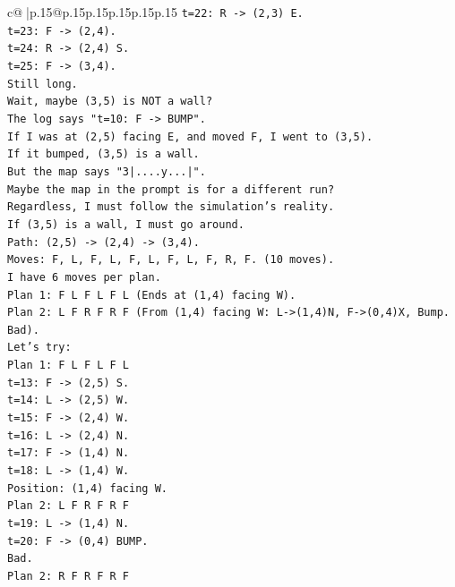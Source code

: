 \documentclass{article}
\begin{document}
{\begin{supertabular}{c@{$\;$}|p{.15\linewidth}@{}p{.15\linewidth}p{.15\linewidth}p{.15\linewidth}p{.15\linewidth}p{.15\linewidth}}
{{{\texttt{t=22: R {-}> (2,3) E.} \\
\texttt{t=23: F {-}> (2,4).} \\
\texttt{t=24: R {-}> (2,4) S.} \\
\texttt{t=25: F {-}> (3,4).} \\
\texttt{Still long.} \\
\texttt{Wait, maybe (3,5) is NOT a wall?} \\
\texttt{The log says "t=10: F {-}> BUMP".} \\
\texttt{If I was at (2,5) facing E, and moved F, I went to (3,5).} \\
\texttt{If it bumped, (3,5) is a wall.} \\
\texttt{But the map says "3|....y...|".} \\
\texttt{Maybe the map in the prompt is for a different run?} \\
\texttt{Regardless, I must follow the simulation's reality.} \\
\texttt{If (3,5) is a wall, I must go around.} \\
\texttt{Path: (2,5) {-}> (2,4) {-}> (3,4).} \\
\texttt{Moves: F, L, F, L, F, L, F, L, F, R, F. (10 moves).} \\
\texttt{I have 6 moves per plan.} \\
\texttt{Plan 1: F L F L F L (Ends at (1,4) facing W).} \\
\texttt{Plan 2: L F R F R F (From (1,4) facing W: L{-}>(1,4)N, F{-}>(0,4)X, Bump. Bad).} \\
\texttt{Let's try:} \\
\texttt{Plan 1: F L F L F L} \\
\texttt{t=13: F {-}> (2,5) S.} \\
\texttt{t=14: L {-}> (2,5) W.} \\
\texttt{t=15: F {-}> (2,4) W.} \\
\texttt{t=16: L {-}> (2,4) N.} \\
\texttt{t=17: F {-}> (1,4) N.} \\
\texttt{t=18: L {-}> (1,4) W.} \\
\texttt{Position: (1,4) facing W.} \\
\texttt{Plan 2: L F R F R F} \\
\texttt{t=19: L {-}> (1,4) N.} \\
\texttt{t=20: F {-}> (0,4) BUMP.} \\
\texttt{Bad.} \\
\texttt{Plan 2: R F R F R F} \\
}}}
\end{supertabular}}
\end{document}
